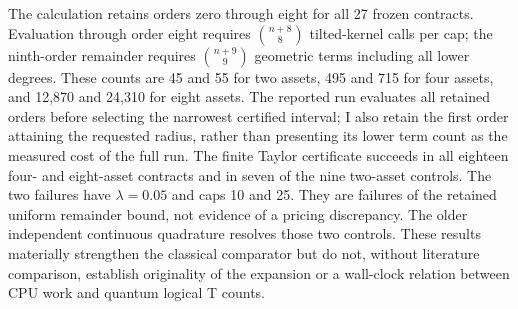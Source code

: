 The calculation retains orders zero through eight for all 27 frozen contracts. Evaluation through order eight requires $\binom{n+8}{8}$ tilted-kernel calls per cap; the ninth-order remainder requires $\binom{n+9}{9}$ geometric terms including all lower degrees. These counts are 45 and 55 for two assets, 495 and 715 for four assets, and 12,870 and 24,310 for eight assets. The reported run evaluates all retained orders before selecting the narrowest certified interval; I also retain the first order attaining the requested radius, rather than presenting its lower term count as the measured cost of the full run. The finite Taylor certificate succeeds in all eighteen four- and eight-asset contracts and in seven of the nine two-asset controls. The two failures have $\lambda=0.05$ and caps 10 and 25. They are failures of the retained uniform remainder bound, not evidence of a pricing discrepancy. The older independent continuous quadrature resolves those two controls. These results materially strengthen the classical comparator but do not, without literature comparison, establish originality of the expansion or a wall-clock relation between CPU work and quantum logical T counts.
